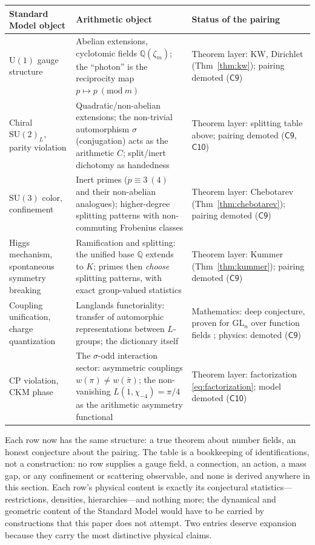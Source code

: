 \documentclass[11pt,a4paper]{article}
\theoremstyle{plain}
\theoremstyle{definition}
\theoremstyle{remark}
\newcommand{\Qq}{\mathbb{Q}}
\begin{document}
\begin{center}
\begin{tabular}{@{}p{}p{}p{}@{}}
\toprule
Standard Model object & Arithmetic object & Status of the pairing\\
\midrule
$\mathrm{U}(1)$ gauge structure &
Abelian extensions, cyclotomic fields $\Qq(\zeta_{m})$; the ``photon'' is the reciprocity
map $p\mapsto p\ (\mathrm{mod}\ m)$ &
Theorem layer: KW, Dirichlet (Thm~\ref{thm:kw}); pairing demoted ($\mathsf{C9}$)\\
Chiral $\mathrm{SU}(2)_{L}$, parity violation &
Quadratic/non-abelian extensions; the non-trivial automorphism $\sigma$ (conjugation) acts
as the arithmetic $C$; split/inert dichotomy as handedness &
Theorem layer: splitting table above; pairing demoted ($\mathsf{C9}$, $\mathsf{C10}$)\\
$\mathrm{SU}(3)$ color, confinement &
Inert primes ($p\equiv3\ (4)$ and their non-abelian analogues); higher-degree splitting
patterns with non-commuting Frobenius classes &
Theorem layer: Chebotarev (Thm~\ref{thm:chebotarev}); pairing demoted ($\mathsf{C9}$)\\
Higgs mechanism, spontaneous symmetry breaking &
Ramification and splitting: the unified base $\Qq$ extends to $K$; primes then
\emph{choose} splitting patterns, with exact group-valued statistics &
Theorem layer: Kummer (Thm~\ref{thm:kummer}); pairing demoted ($\mathsf{C9}$)\\
Coupling unification, charge quantization &
Langlands functoriality: transfer of automorphic representations between $L$-groups;
the dictionary itself &
Mathematics: deep conjecture, proven for $\mathrm{GL}_{n}$ over function fields
\cite{lafforgue2002}; physics: demoted ($\mathsf{C9}$)\\
CP violation, CKM phase &
The $\sigma$-odd interaction sector: asymmetric couplings
$w(\pi)\neq w(\bar\pi)$; the non-vanishing $L(1,\chi_{-4})=\pi/4$ as the arithmetic
asymmetry functional &
Theorem layer: factorization \eqref{eq:factorization}; model demoted ($\mathsf{C10}$)\\
\bottomrule
\end{tabular}
\end{center}

Each row now has the same structure: a true theorem about number fields, an honest
conjecture about the pairing. The table is a bookkeeping of identifications, not a
construction: no row supplies a gauge field, a connection, an action, a mass gap, or any
confinement or scattering observable, and none is derived anywhere in this section. Each
row's physical content is exactly its conjectural statistics---restrictions, densities,
hierarchies---and nothing more; the dynamical and geometric content of the Standard Model
would have to be carried by constructions that this paper does not attempt. Two entries
deserve expansion because they carry the
most distinctive physical claims.
\end{document}
